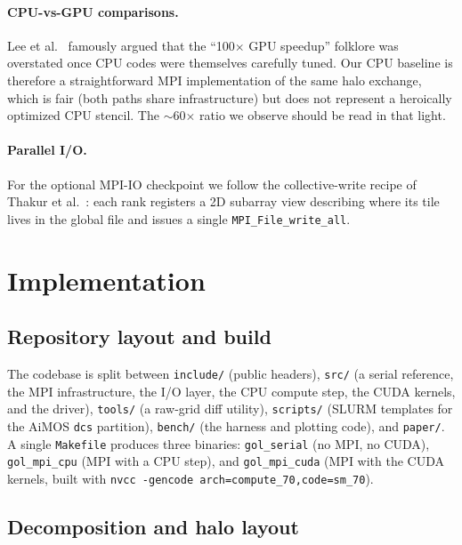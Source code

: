 \documentclass[sigconf,nonacm,10pt]{acmart}
\begin{document}
\paragraph{CPU-vs-GPU comparisons.}
Lee et al.~\cite{lee2010debunking} famously argued that the
``100$\times$ GPU speedup'' folklore was overstated once CPU codes were
themselves carefully tuned. Our CPU baseline is therefore a
straightforward MPI implementation of the same halo exchange, which is
fair (both paths share infrastructure) but does not represent a
heroically optimized CPU stencil. The $\sim$60$\times$ ratio we
observe should be read in that light.

\paragraph{Parallel I/O.}
For the optional MPI-IO checkpoint we follow the collective-write
recipe of Thakur et al.~\cite{thakur2005mpiio}: each rank registers a
2D subarray view describing where its tile lives in the global file
and issues a single \texttt{MPI\_File\_write\_all}.

\section{Implementation}\label{sec:impl}

\subsection{Repository layout and build}

The codebase is split between \texttt{include/} (public headers),
\texttt{src/} (a serial reference, the MPI infrastructure, the I/O
layer, the CPU compute step, the CUDA kernels, and the driver),
\texttt{tools/} (a raw-grid diff utility), \texttt{scripts/} (SLURM
templates for the AiMOS \texttt{dcs} partition), \texttt{bench/}
(the harness and plotting code), and \texttt{paper/}.
A single \texttt{Makefile} produces three binaries: \texttt{gol\_serial}
(no MPI, no CUDA), \texttt{gol\_mpi\_cpu} (MPI with a CPU step), and
\texttt{gol\_mpi\_cuda} (MPI with the CUDA kernels, built with
\texttt{nvcc -gencode arch=compute\_70,code=sm\_70}).

\subsection{Decomposition and halo layout}
\end{document}
